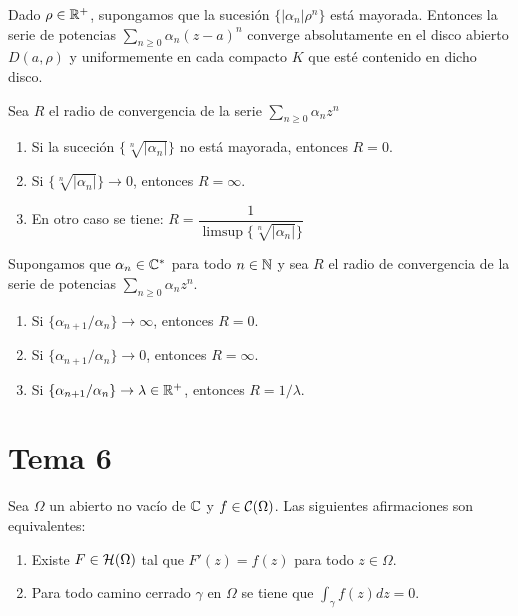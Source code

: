 \documentclass[12pt]{article}
\begin{document}
    \begin{lema} Dado $\rho\in \mathbb{R}^+$, supongamos que la sucesión $\{|\alpha_n|\rho^n\}$ está mayorada. Entonces la serie de potencias $\sum\limits_{n\geq 0} \alpha_n ( z-a)^n$ converge absolutamente en el disco abierto $D(a, \rho)$ y uniformemente en cada compacto $K$ que esté contenido en dicho disco.
    \end{lema}

    \begin{prop}
        Sea $R$ el radio de convergencia de la serie $\sum\limits_{n\geq0}\alpha_nz^n$
        \begin{enumerate}
            \item Si la suceción $\{\sqrt[n]{|\alpha_n|}\}$ no está mayorada, entonces $R=0$.
            \item Si $\{\sqrt[n]{|\alpha_n|}\} \to 0$, entonces $R=\infty$.
            \item En otro caso se tiene: $R = \dfrac{1}{\limsup \{\sqrt[n]{|\alpha_n|}\}}$
        \end{enumerate}
    \end{prop}

    \begin{coro}
        Supongamos que $\alpha_n\in \mathbb{C}^*$ para todo $n\in \mathbb{N}$ y sea $R$ el radio de convergencia de la serie de potencias $\sum\limits_{n\geq 0} \alpha_n z^n$.
        \begin{enumerate}
            \item Si $\{\alpha_{n+1} / \alpha_n\} \to \infty$, entonces $R=0$.
            \item Si $\{\alpha_{n+1} / \alpha_n\} \to 0$, entonces $R=\infty$.
            \item Si $\{\alpha_{n+1} / \alpha_n\} \to \lambda \in \mathbb{R}^+$, entonces $R=1/\lambda$.
        \end{enumerate}
    \end{coro}

    \newpage

    \section{Tema 6}

    \begin{teo} Sea $\Omega$ un abierto no vacío de $\mathbb{C}$ y $f\in \mathcal{C}(\Omega)$. Las siguientes afirmaciones son equivalentes:
    \begin{enumerate}
        \item Existe $F\in \mathcal{H}(\Omega)$ tal que $F'(z) = f(z)$ para todo $z\in \Omega$.
        \item Para todo camino cerrado $\gamma$ en $\Omega$ se tiene que $\displaystyle\int_\gamma f(z)dz = 0$.
    \end{enumerate}
        
    \end{teo}
\end{document}
